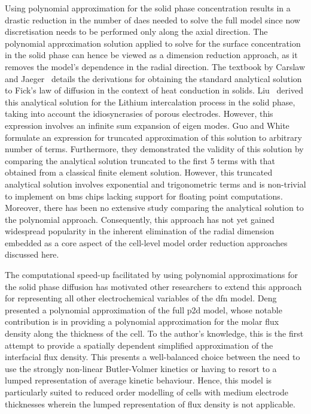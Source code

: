 Using polynomial  approximation for the  solid phase concentration results  in a
drastic  reduction  in  the  number  of \gls{dae}s  needed  to  solve  the  full
model  since now  discretisation  needs to  be performed  only  along the  axial
direction.  The  polynomial approximation  solution  applied  to solve  for  the
surface concentration  in the  solid phase  can hence be  viewed as  a dimension
reduction  approach,  as  it  removes  the  model's  dependence  in  the  radial
direction.  The textbook  by Carslaw  and Jaeger~\cite{Carslaw1947}  details the
derivations  for obtaining  the standard  analytical solution  to Fick's  law of
diffusion  in the  context  of heat  conduction  in solids.  Liu~\cite{Liu2006a}
derived this  analytical solution for  the Lithium intercalation process  in the
solid  phase,  taking into  account  the  idiosyncrasies of  porous  electrodes.
However, this expression involves an infinite  sum expansion of eigen modes. Guo
and White~\cite{Guo2012} formulate an  expression for truncated approximation of
this solution to  arbitrary number of terms. Furthermore,  they demonstrated the
validity  of  this  solution  by comparing  the  analytical  solution  truncated
to  the  first 5  terms  with  that obtained  from  a  classical finite  element
solution.  However,  this  truncated analytical  solution  involves  exponential
and  trigonometric terms  and is  non-trivial  to implement  on \gls{bms}  chips
lacking support  for floating  point computations. Moreover,  there has  been no
extensive study  comparing the analytical  solution to the  polynomial approach.
Consequently,  this approach  has not  yet gained  widespread popularity  in the
inherent elimination  of the radial dimension  embedded as a core  aspect of the
cell-level model order reduction  approaches discussed here.




The computational  speed-up facilitated  by using polynomial  approximations for
the  solid  phase diffusion  has  motivated  other  researchers to  extend  this
approach for representing  all other electrochemical variables  of the \gls{dfn}
model. Deng~\etal{}~\cite{Deng2018} presented a  polynomial approximation of the
full \gls{p2d}  model, whose notable  contribution is in providing  a polynomial
approximation for  the molar flux  density along the  thickness of the  cell. To
the  author's knowledge,  this  is  the first  attempt  to  provide a  spatially
dependent  simplified  approximation  of  the  interfacial  flux  density.  This
presents a well-balanced choice between the  need to use the strongly non-linear
Butler-Volmer kinetics or having to resort to a lumped representation of average
kinetic behaviour.  Hence, this  model is particularly  suited to  reduced order
modelling  of  cells  with  medium  electrode  thicknesses  wherein  the  lumped
representation of flux density is not applicable.

